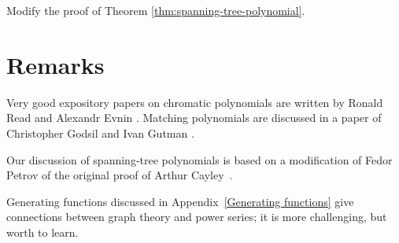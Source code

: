  Modify the proof of Theorem \ref{thm:spanning-tree-polynomial}.

\section*{Remarks}

Very good expository papers on chromatic polynomials are written by
Ronald Read \cite{read} and Alexandr Evnin \cite{evnin-chnom}. 
Matching polynomials are discussed in a paper of Christopher Godsil and Ivan Gutman \cite{godsil-gutman}.

Our discussion of spanning-tree polynomials is based on a modification of Fedor Petrov \cite{petrov} of the original proof of Arthur Cayley~\cite{cayley}. 

Generating functions discussed in Appendix~\ref{Generating functions} give connections between graph theory and power series; it is more challenging, but worth to learn.   
